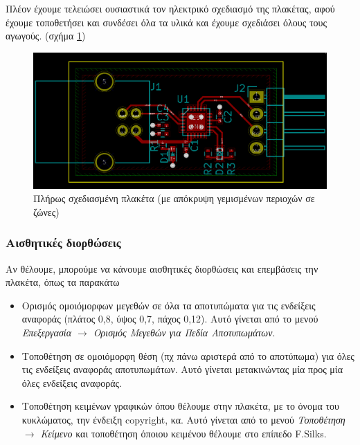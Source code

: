 \documentclass[a4paper]{article}
\begin{document}
Πλέον έχουμε τελειώσει ουσιαστικά τον ηλεκτρικό σχεδιασμό της πλακέτας, αφού έχουμε τοποθετήσει και συνδέσει όλα τα υλικά και έχουμε σχεδιάσει όλους τους αγωγούς. (σχήμα \ref{fig:pcb-circ-final})

\begin{figure}
  \begin{center}
    \includegraphics[width=.9\textwidth]{img/pcb-circ-final.png}
    \caption{Πλήρως σχεδιασμένη πλακέτα (με απόκρυψη γεμισμένων περιοχών σε ζώνες)}
    \label{fig:pcb-circ-final}
  \end{center}
\end{figure}


\subsubsection{Αισθητικές διορθώσεις}

Αν θέλουμε, μπορούμε να κάνουμε αισθητικές διορθώσεις και επεμβάσεις την πλακέτα, όπως τα παρακάτω
\begin{itemize}
    \item Ορισμός ομοιόμορφων μεγεθών σε όλα τα αποτυπώματα για τις ενδείξεις αναφοράς (πλάτος 0,8, ύψος 0,7, πάχος 0,12). Αυτό γίνεται από το μενού \textit{Επεξεργασία $\rightarrow$ Ορισμός Μεγεθών για Πεδία Αποτυπωμάτων}.
    \item Τοποθέτηση σε ομοιόμορφη θέση (πχ πάνω αριστερά από το αποτύπωμα) για όλες τις ενδείξεις αναφοράς αποτυπωμάτων. Αυτό γίνεται μετακινώντας μία προς μία όλες ενδείξεις αναφοράς.
    \item Τοποθέτηση κειμένων γραφικών όπου θέλουμε στην πλακέτα, με το όνομα του κυκλώματος, την ένδειξη copyright, κα. Αυτό γίνεται από το μενού \textit{Τοποθέτηση $\rightarrow$ Κείμενο} και τοποθέτηση όποιου κειμένου θέλουμε στο επίπεδο F.Silks.
\end{itemize}
\end{document}

